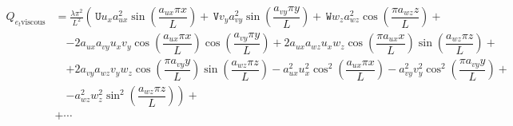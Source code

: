 \documentclass[10pt]{article}
\newcommand{\U}{\,\mathtt{U}}
\newcommand{\V}{\,\mathtt{V}}
\newcommand{\W}{\,\mathtt{W}}
\newcommand{\viscous}{\text{viscous}}
\begin{document}
\begin{equation*}
\begin{split}
%
Q_{e_t \viscous} &= \frac{\lambda \pi^{2} }{L^{2}}\left(\U u_{x} a_{ux}^{2} \sin\left(\dfrac{a_{ux} \pi x}{L}\right) + \V
v_{y} a_{vy}^{2} \sin\left(\dfrac{a_{vy} \pi y}{L}\right) + \W w_{z} a_{wz}^{2} \cos\left(\dfrac{\pi
a_{wz} z}{L}\right) \right.+\\
  &\quad\left.- 2 a_{ux} a_{vy} u_{x} v_{y} \cos\left(\dfrac{a_{ux} \pi x}{L}\right)
\cos\left(\dfrac{a_{vy} \pi y}{L}\right) + 2 a_{ux} a_{wz} u_{x} w_{z} \cos\left(\dfrac{\pi a_{ux}
x}{L}\right) \sin\left(\dfrac{a_{wz} \pi z}{L}\right) \right.+\\
  &\quad\left.+ 2 a_{vy} a_{wz} v_{y} w_{z} \cos\left(\dfrac{\pi
a_{vy} y}{L}\right) \sin\left(\dfrac{a_{wz} \pi z}{L}\right) - a_{ux}^{2} u_{x}^{2}
\cos^2\left(\dfrac{a_{ux} \pi x}{L}\right) - a_{vy}^{2} v_{y}^{2} \cos^2\left(\dfrac{\pi a_{vy}
y}{L}\right) \right.+\\
  &\quad\left.- a_{wz}^{2} w_{z}^{2} \sin^2\left(\dfrac{a_{wz} \pi z}{L}\right)\right) +\\
%
&+\cdots
 \end{split}
\end{equation*}
\end{document}
